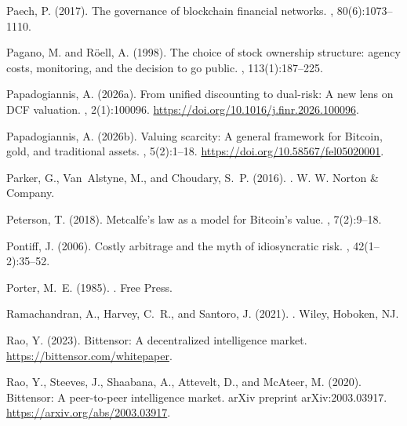 \documentclass[12pt]{article}
\begin{document}
\begin{thebibliography}{}
Paech, P. (2017).
\newblock The governance of blockchain financial networks.
, 80(6):1073--1110.

Pagano, M. and Röell, A. (1998).
\newblock The choice of stock ownership structure: agency costs, monitoring,
  and the decision to go public.
, 113(1):187--225.

Papadogiannis, A. (2026a).
\newblock From unified discounting to dual-risk: A new lens on DCF valuation.
, 2(1):100096.
\newblock \url{https://doi.org/10.1016/j.finr.2026.100096}.

Papadogiannis, A. (2026b).
\newblock Valuing scarcity: A general framework for Bitcoin, gold, and
  traditional assets.
, 5(2):1--18.
\newblock \url{https://doi.org/10.58567/fel05020001}.

Parker, G., Van~Alstyne, M., and Choudary, S.~P. (2016).
.
\newblock W. W. Norton \& Company.

Peterson, T. (2018).
\newblock Metcalfe's law as a model for Bitcoin's value.
, 7(2):9--18.

Pontiff, J. (2006).
\newblock Costly arbitrage and the myth of idiosyncratic risk.
, 42(1--2):35--52.

Porter, M.~E. (1985).
.
\newblock Free Press.

Ramachandran, A., Harvey, C.~R., and Santoro, J. (2021).
.
\newblock Wiley, Hoboken, NJ.

Rao, Y. (2023).
\newblock Bittensor: A decentralized intelligence market.
\newblock \url{https://bittensor.com/whitepaper}.

Rao, Y., Steeves, J., Shaabana, A., Attevelt, D., and McAteer, M. (2020).
\newblock Bittensor: A peer-to-peer intelligence market.
\newblock arXiv preprint arXiv:2003.03917.
\newblock \url{https://arxiv.org/abs/2003.03917}.


\end{thebibliography}
\end{document}
